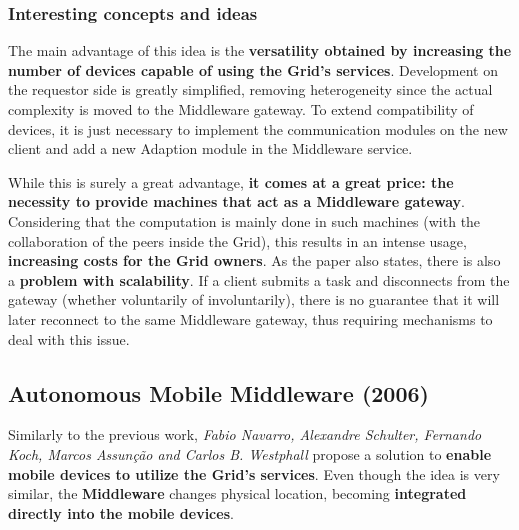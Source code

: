 \subsubsection{Interesting concepts and ideas}
The main advantage of this idea is the \textbf{versatility obtained by increasing the number of devices capable of using the Grid's services}. Development on the requestor side is greatly simplified, removing heterogeneity since the actual complexity is moved to the Middleware gateway. To extend compatibility of devices, it is just necessary to implement the communication modules on the new client and add a new Adaption module in the Middleware service.

While this is surely a great advantage, \textbf{it comes at a great price: the necessity to provide machines that act as a Middleware gateway}. Considering that the computation is mainly done in such machines (with the collaboration of the peers inside the Grid), this results in an intense usage, \textbf{increasing costs for the Grid owners}.
As the paper also states, there is also a \textbf{problem with scalability}. If a client submits a task and disconnects from the gateway (whether voluntarily of involuntarily), there is no guarantee that it will later reconnect to the same Middleware gateway, thus requiring mechanisms to deal with this issue.

\subsection{Autonomous Mobile Middleware (2006)}\label{autonomous_mobile_middleware}
Similarly to the previous work, \textit{Fabio Navarro, Alexandre Schulter, Fernando Koch, Marcos Assunção and Carlos B. Westphall} propose a solution to \textbf{enable mobile devices to utilize the Grid's services}. Even though the idea is very similar, the \textbf{Middleware} changes physical location, becoming \textbf{integrated directly into the mobile devices}.

